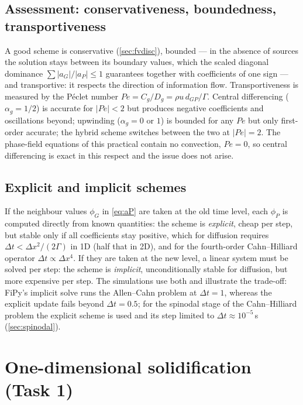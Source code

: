 \documentclass[11pt,a4paper]{article}
\numberwithin{equation}{section}
\theoremstyle{remark}
\begin{document}
\subsection{Assessment: conservativeness, boundedness, transportiveness}\label{sec:fvassess}

A good scheme is conservative (\cref{sec:fvdisc}), bounded --- in the absence of sources the solution
stays between its boundary values, which the scaled diagonal dominance
$\sum|a_G|/|a_P| \le 1$ guarantees together with coefficients of one sign --- and transportive: it
respects the direction of information flow. Transportiveness is measured by the P\'eclet number
$Pe = C_g/D_g = \rho u\,d_{GP}/\Gamma$. Central differencing ($\alpha_g = 1/2$) is accurate for
$|Pe| < 2$ but produces negative coefficients and oscillations beyond; upwinding ($\alpha_g = 0$ or
$1$) is bounded for any $Pe$ but only first-order accurate; the hybrid scheme switches between the two
at $|Pe| = 2$. The phase-field equations of this practical contain no convection, $Pe = 0$, so central
differencing is exact in this respect and the issue does not arise.

\subsection{Explicit and implicit schemes}\label{sec:explicit}

If the neighbour values $\phi_G$ in \cref{eq:aP} are taken at the old time level, each $\phi_P$ is
computed directly from known quantities: the scheme is \emph{explicit}, cheap per step, but stable
only if all coefficients stay positive, which for diffusion requires
$\Delta t < \Delta x^2/(2\Gamma)$ in 1D (half that in 2D), and for the fourth-order Cahn--Hilliard
operator $\Delta t \propto \Delta x^4$. If they are taken at the new level, a linear system must be
solved per step: the scheme is \emph{implicit}, unconditionally stable for diffusion, but more
expensive per step. The simulations use both and illustrate the trade-off: FiPy's implicit solve runs the
Allen--Cahn problem at $\Delta t = 1$, whereas the explicit update fails beyond $\Delta t = 0.5$; for
the spinodal stage of the Cahn--Hilliard problem the explicit scheme is used and its step limited to
$\Delta t \approx 10^{-5}$\,s (\cref{sec:spinodal}).

\section{One-dimensional solidification (Task 1)}\label{sec:task1}
\end{document}
